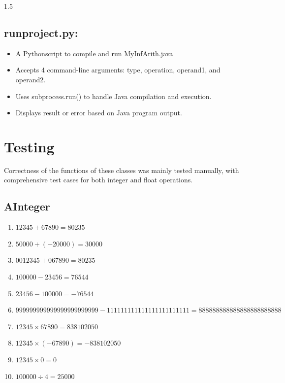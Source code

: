 \documentclass{article}
\begin{document}
\begin{spacing}{1.5}
{ \subsection{runproject.py:}
 \begin{itemize}
     \item A Pythonscript to compile and run MyInfArith.java 
     \item Accepts 4 command-line arguments: type, operation, operand1, and operand2.
     \item Uses subprocess.run() to handle Java compilation and execution.
     \item Displays result or error based on Java program output.
 \end{itemize}

\section{Testing}
 Correctness of the functions of these classes was mainly tested manually, with comprehensive test cases for both integer and float operations.
 \subsection{AInteger}
 \begin{enumerate}
     \item \( 12345 + 67890 = 80235 \)
     \item \( 50000 + (-20000) = 30000 \)
    \item \( 0012345 + 067890 = 80235 \)
    \item \( 100000 - 23456 = 76544 \)
    \item \( 23456 - 100000 = -76544 \)
    \item \( 999999999999999999999999 - 111111111111111111111111 = 888888888888888888888888 \)
    \item \( 12345 \times 67890 = 838102050 \)
    \item \( 12345 \times (-67890) = -838102050 \)
    \item \( 12345 \times 0 = 0 \)
    \item \( 100000 \div 4 = 25000 \)
 \end{enumerate}
}
\end{spacing}
\end{document}
